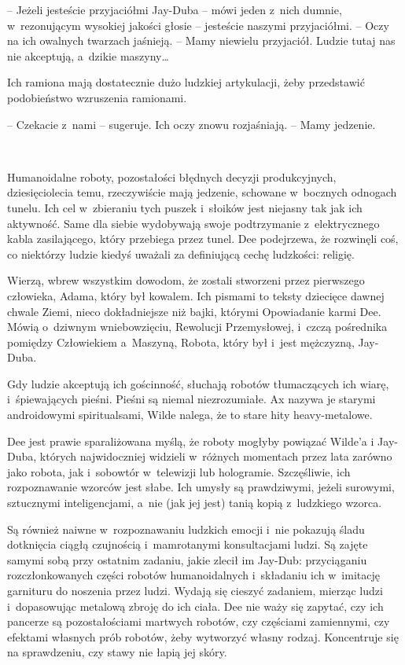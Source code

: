 \documentclass[oneside,polish,11pt,sfheadings]{mwbk}
\begin{document}
-- Jeżeli jesteście przyjaciółmi Jay-Duba -- mówi jeden z~nich dumnie, w~rezonującym wysokiej jakości głosie -- jesteście naszymi przyjaciółmi. -- Oczy na ich owalnych twarzach jaśnieją. -- Mamy niewielu przyjaciół.
Ludzie tutaj nas nie akceptują, a~dzikie maszyny\ldots

Ich ramiona mają dostatecznie dużo ludzkiej artykulacji, żeby
przedstawić podobieństwo wzruszenia ramionami.

-- Czekacie z~nami -- sugeruje. Ich oczy znowu rozjaśniają. -- Mamy
jedzenie.

~

Humanoidalne roboty, pozostałości błędnych decyzji produkcyjnych,
dziesięciolecia temu, rzeczywiście mają jedzenie, schowane w~bocznych
odnogach tunelu. Ich cel w~zbieraniu tych puszek i~słoików jest niejasny
tak jak ich aktywność. Same dla siebie wydobywają swoje podtrzymanie z~elektrycznego kabla zasilającego, który przebiega przez tunel. Dee
podejrzewa, że rozwinęli coś, co niektórzy ludzie kiedyś uważali za
definiującą cechę ludzkości: religię.

Wierzą, wbrew wszystkim dowodom, że zostali stworzeni przez pierwszego
człowieka, Adama, który był kowalem. Ich pismami to teksty dziecięce
dawnej chwale Ziemi, nieco dokładniejsze niż bajki, którymi Opowiadanie
karmi Dee. Mówią o~dziwnym wniebowzięciu, Rewolucji Przemysłowej, i~czczą pośrednika pomiędzy Człowiekiem a~Maszyną, Robota, który był i~jest mężczyzną, Jay-Duba.

Gdy ludzie akceptują ich gościnność, słuchają robotów tłumaczących ich
wiarę, i~śpiewających pieśni. Pieśni są niemal niezrozumiałe. Ax nazywa
je starymi androidowymi spiritualsami, Wilde nalega, że to stare hity
heavy-metalowe.

Dee jest prawie sparaliżowana myślą, że roboty mogłyby powiązać Wilde'a
i Jay-Duba, których najwidoczniej widzieli w~różnych momentach przez
lata zarówno jako robota, jak i~sobowtór w~telewizji lub hologramie.
Szczęśliwie, ich rozpoznawanie wzorców jest słabe. Ich umysły są
prawdziwymi, jeżeli surowymi, sztucznymi inteligencjami, a~nie (jak jej
jest) tanią kopią z~ludzkiego wzorca.

Są również naiwne w~rozpoznawaniu ludzkich emocji i~nie pokazują śladu
dotknięcia ciągłą czujnością i~mamrotanymi konsultacjami ludzi. Są
zajęte samymi sobą przy ostatnim zadaniu, jakie zlecił im Jay-Dub:
przyciąganiu rozczłonkowanych części robotów humanoidalnych i~składaniu
ich w~imitację garnituru do noszenia przez ludzi. Wydają się cieszyć
zadaniem, mierząc ludzi i~dopasowując metalową zbroję do ich ciała. Dee
nie waży się zapytać, czy ich pancerze są pozostałościami martwych
robotów, czy częściami zamiennymi, czy efektami własnych prób robotów,
żeby wytworzyć własny rodzaj. Koncentruje się na sprawdzeniu, czy stawy
nie łapią jej skóry.
\end{document}
